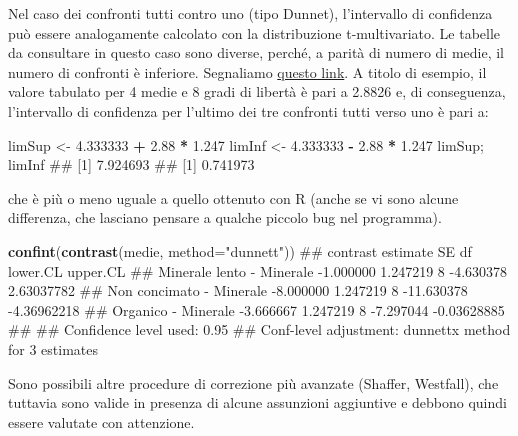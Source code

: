 \documentclass[a4paper,12pt,oneside]{book}
\newenvironment{Shaded}{\begin{snugshade}}{\end{snugshade}}
\newcommand{\KeywordTok}[1]{\textcolor[rgb]{0.13,0.29,0.53}{\textbf{#1}}}
\newcommand{\DataTypeTok}[1]{\textcolor[rgb]{0.13,0.29,0.53}{#1}}
\newcommand{\FloatTok}[1]{\textcolor[rgb]{0.00,0.00,0.81}{#1}}
\newcommand{\StringTok}[1]{\textcolor[rgb]{0.31,0.60,0.02}{#1}}
\newcommand{\OperatorTok}[1]{\textcolor[rgb]{0.81,0.36,0.00}{\textbf{#1}}}
\newcommand{\NormalTok}[1]{#1}
\theoremstyle{definition}
\theoremstyle{definition}
\theoremstyle{definition}
\theoremstyle{remark}
\begin{document}
\normalsize

Nel caso dei confronti tutti contro uno (tipo Dunnet), l'intervallo di
confidenza può essere analogamente calcolato con la distribuzione
t-multivariato. Le tabelle da consultare in questo caso sono diverse,
perché, a parità di numero di medie, il numero di confronti è inferiore.
Segnaliamo
\href{http://www.stat.ufl.edu/~winner/tables/dunnett-2side.pdf}{questo
link}. A titolo di esempio, il valore tabulato per 4 medie e 8 gradi di
libertà è pari a 2.8826 e, di conseguenza, l'intervallo di confidenza
per l'ultimo dei tre confronti tutti verso uno è pari a:

\begin{Shaded}
\begin{Highlighting}[]
\NormalTok{limSup <-}\StringTok{ }\FloatTok{4.333333} \OperatorTok{+}\StringTok{ }\FloatTok{2.88} \OperatorTok{*}\StringTok{ }\FloatTok{1.247}
\NormalTok{limInf <-}\StringTok{ }\FloatTok{4.333333} \OperatorTok{-}\StringTok{ }\FloatTok{2.88} \OperatorTok{*}\StringTok{ }\FloatTok{1.247}
\NormalTok{limSup; limInf}
\NormalTok{## [1] 7.924693}
\NormalTok{## [1] 0.741973}
\end{Highlighting}
\end{Shaded}

che è più o meno uguale a quello ottenuto con R (anche se vi sono alcune
differenza, che lasciano pensare a qualche piccolo bug nel programma).

\small

\begin{Shaded}
\begin{Highlighting}[]
\KeywordTok{confint}\NormalTok{(}\KeywordTok{contrast}\NormalTok{(medie, }\DataTypeTok{method=}\StringTok{"dunnett"}\NormalTok{))}
\NormalTok{##  contrast                   estimate       SE df   lower.CL    upper.CL}
\NormalTok{##  Minerale lento - Minerale -1.000000 1.247219  8  -4.630378  2.63037782}
\NormalTok{##  Non concimato - Minerale  -8.000000 1.247219  8 -11.630378 -4.36962218}
\NormalTok{##  Organico - Minerale       -3.666667 1.247219  8  -7.297044 -0.03628885}
\NormalTok{## }
\NormalTok{## Confidence level used: 0.95 }
\NormalTok{## Conf-level adjustment: dunnettx method for 3 estimates}
\end{Highlighting}
\end{Shaded}

\normalsize

Sono possibili altre procedure di correzione più avanzate (Shaffer,
Westfall), che tuttavia sono valide in presenza di alcune assunzioni
aggiuntive e debbono quindi essere valutate con attenzione.
\end{document}
